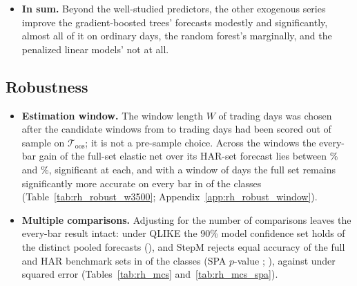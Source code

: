 \begin{itemize}
\begin{itemize}
    \rhabXgbFullVsAddRmFomcAllDm{} and \rhabRfFullVsAddRmFomcAllDm), and on ordinary days by
    \rhabLgbmFullVsAddRmFomcOrdPct, \rhabXgbFullVsAddRmFomcOrdPct{} and \rhabRfFullVsAddRmFomcOrdPct\%
    ($p$-values \rhabLgbmFullVsAddRmFomcOrdP, \rhabXgbFullVsAddRmFomcOrdP{} and \rhabRfFullVsAddRmFomcOrdP).
  \item The well-studied predictors thus account for nearly all of the gain of Table~\ref{tab:rh_oos}: HAR\,+\,RM\,+\,FOMC
    alone lowers the every-bar loss below the HAR benchmark's by \rhabRidgeAddRmFomcVsHarAllPct\% (ridge) to
    \rhabXgbAddRmFomcVsHarAllPct\% (XGBoost).
  \end{itemize}
\item \textbf{In sum.} Beyond the well-studied predictors, the other exogenous series improve the gradient-boosted
  trees' forecasts modestly and significantly, almost all of it on ordinary days, the random forest's marginally, and
  the penalized linear models' not at all.
\end{itemize}

\subsection{Robustness}
\label{sec:rh_results_robust}
\begin{itemize}
\item \textbf{Estimation window.} The window length $W$ of \rhorWindowDays{} trading days was chosen after the
  \rhwsNWinWord{} candidate windows from \rhwsWinMin{} to \rhrbWinLong{} trading days had been scored out of sample on
  $\mathcal T_{\mathrm{oos}}$; it is not a pre-sample choice. Across the windows the every-bar gain of the full-set
  elastic net over its HAR-set forecast lies between \rhwsEnetBarPctMin\% and \rhwsEnetBarPctMax\%, significant at
  each, and with a window of \rhrbWinLong{} days the full set remains significantly more accurate on every bar in
  \rhrbNFullLowerSigBarLong{} of the \rhrbNModelsLong{} classes (Table~\ref{tab:rh_robust_w3500};
  Appendix~\ref{app:rh_robust_window}).
\item \textbf{Multiple comparisons.} Adjusting for the number of comparisons leaves the every-bar result intact: under
  QLIKE the 90\% model confidence set \citep{HansenLundeNason2011} holds \rhmcsBarQlikeTmaxNNinety{} of the
  \rhmcsNModels{} distinct pooled forecasts (\rhmcsBarQlikeTmaxSetNinety), and StepM \citep{RomanoWolf2005} rejects
  equal accuracy of the full and HAR benchmark sets in \rhmcsBarQAfNRej{} of the \rhmcsNAlt{} classes (SPA
  $p$-value \rhmcsBarQAfSpaC; \citealp{Hansen2005}), against \rhmcsBarMAfNRejWord{} under squared error
  (Tables~\ref{tab:rh_mcs} and~\ref{tab:rh_mcs_spa}).
\end{itemize}
